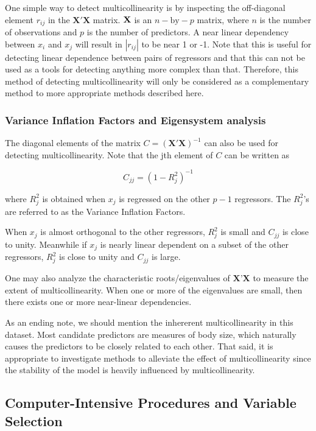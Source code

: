 \documentclass[11pt]{article}
\begin{document}
One simple way to detect multicollinearity is by inspecting the off-diagonal element \(r_{ij}\) in the 
\(\textbf{X}' \textbf{X}\) matrix. \(\textbf X\) is an \(n-\text{by}-p\) matrix, where \(n\) is the number of observations 
and \(p\) is the number of predictors.
A near linear dependency between \(x_i\) and \(x_j\) will result in \(|r_{ij}|\) to be near 1 or -1. Note that this is
useful for detecting linear dependence between pairs of regressors and that this can not be used as a tools for
detecting anything more complex than that. Therefore, this method of detecting multicollinearity will
only be considered as a complementary method to more appropriate methods described here.

\subsubsection{Variance Inflation Factors and Eigensystem analysis}
\label{sec:org5dda979}

The diagonal elements of the matrix \(C = (\textbf{X}' \textbf{X})^{-1}\) can also be used for detecting multicollinearity. 
Note that the jth element of \(C\) can be written as

\[
   C_{jj}=(1-R_j^2)^{-1}
   \]

where \(R_j^2\) is obtained when \(x_j\) is regressed on the other \(p-1\) regressors. The \(R_j^2\)'s are 
referred to as the Variance Inflation Factors.

When \(x_j\) is almost orthogonal to the other regressors, \(R_j^2\) is small and \(C_{jj}\) is close to unity. Meanwhile 
if \(x_j\) is nearly linear dependent on a subset of the other regressors, \(R^2_j\) is close to unity and \(C_{jj}\)
is large.

One may also analyze the characteristic roots/eigenvalues of \(\textbf{X}’\textbf{X}\) to measure the extent of
multicollinearity. When one or more of the eigenvalues are small, then there exists one or more near-linear
dependencies. 

As an ending note, we should mention the inhererent multicollinearity in this dataset. Most candidate predictors 
are measures of body size, which naturally causes the predictors to be closely related to each other. That 
said, it is appropriate to investigate methods to alleviate the effect of multicollinearity since 
the stability of the model is heavily influenced by multicollinearity.

\subsection{Computer-Intensive Procedures and Variable Selection}
\label{sec:org2d7f034}
\end{document}

